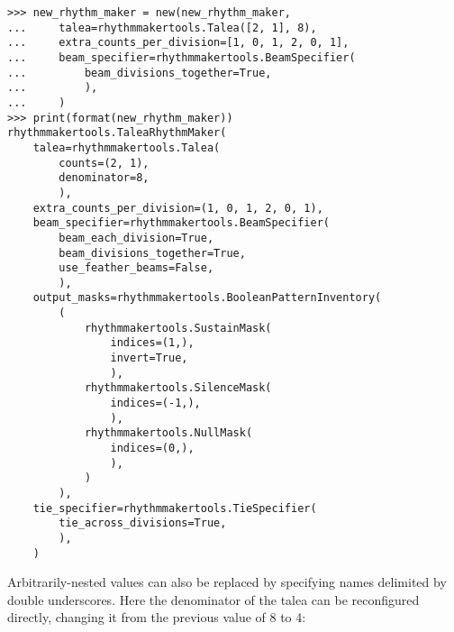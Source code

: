 \begin{abjadbookoutput}
\begin{singlespacing}
\vspace{-0.5\baselineskip}
\begin{verbatim}
>>> new_rhythm_maker = new(new_rhythm_maker,
...     talea=rhythmmakertools.Talea([2, 1], 8),
...     extra_counts_per_division=[1, 0, 1, 2, 0, 1],
...     beam_specifier=rhythmmakertools.BeamSpecifier(
...         beam_divisions_together=True,
...         ),
...     )
>>> print(format(new_rhythm_maker))
rhythmmakertools.TaleaRhythmMaker(
    talea=rhythmmakertools.Talea(
        counts=(2, 1),
        denominator=8,
        ),
    extra_counts_per_division=(1, 0, 1, 2, 0, 1),
    beam_specifier=rhythmmakertools.BeamSpecifier(
        beam_each_division=True,
        beam_divisions_together=True,
        use_feather_beams=False,
        ),
    output_masks=rhythmmakertools.BooleanPatternInventory(
        (
            rhythmmakertools.SustainMask(
                indices=(1,),
                invert=True,
                ),
            rhythmmakertools.SilenceMask(
                indices=(-1,),
                ),
            rhythmmakertools.NullMask(
                indices=(0,),
                ),
            )
        ),
    tie_specifier=rhythmmakertools.TieSpecifier(
        tie_across_divisions=True,
        ),
    )
\end{verbatim}
\end{singlespacing}
\end{abjadbookoutput}

\noindent Arbitrarily-nested values can also be replaced by specifying names
delimited by double underscores. Here the denominator of the talea can be
reconfigured directly, changing it from the previous value of 8 to 4:

\begin{comment}
<abjad>
new_rhythm_maker = new(new_rhythm_maker,
    talea__denominator=4,
    )
print(format(new_rhythm_maker))
</abjad>
\end{comment}

